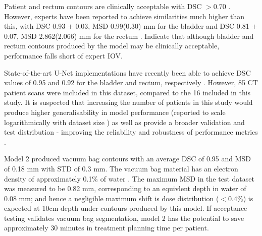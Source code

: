 Patient and rectum contours are clinically acceptable with DSC $>0.70$ \cite{Roach_2019}. However, experts have been reported to achieve similarities much higher than this, with  DSC 0.93 $\pm$ 0.03, MSD 0.99(0.30) mm for the bladder and DSC 0.81 $\pm$ 0.07, MSD 2.862(2.066) mm for the rectum \cite{Roach_2019}. Indicate that although bladder and rectum contours produced by the model may be clinically acceptable, performance falls short of expert IOV.

State-of-the-art U-Net implementations have recently been able to achieve DSC values of 0.95 and 0.92 for the bladder and rectum, respectively \cite{Kazemifar_2018}. However, 85 CT patient scans were included in this dataset, compared to the 16 included in this study. It is suspected that increasing the number of patients in this study would produce higher generalisability in model performance (reported to scale logarithmically with dataset size \cite{Nemoto_2020}) as well as provide a broader validation and test distribution - improving the reliability and robustness of performance metrics \cite{Ronneberger_2015}. 

Model 2 produced vacuum bag contours with an average DSC of 0.95 and MSD of 0.18 mm with STD of 0.3 mm. The vacuum bag material has an electron density of approximately 0.1\% of water \cite{Park}. The maximum MSD in the test dataset was measured to be 0.82 mm, corresponding to an equivlent depth in water of 0.08 mm; and hence a negligible maximum shift is dose distribution ($<0.4\%$) is expected at 10cm depth under contours produced by this model. If acceptance testing validates vacuum bag segmentation, model 2 has the potential to save approximately 30 minutes in treatment planning time per patient.






	
%
%
%



